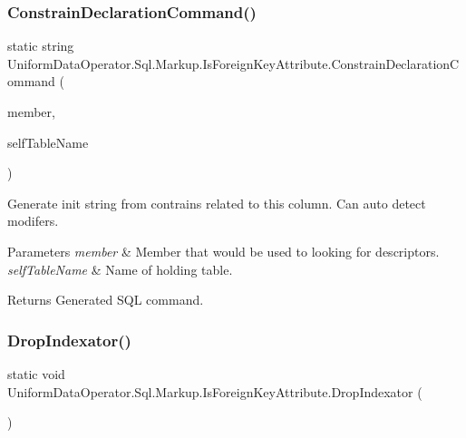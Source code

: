 \subsubsection{\texorpdfstring{Constrain\+Declaration\+Command()}{ConstrainDeclarationCommand()}\hspace{0.1cm}{\footnotesize\ttfamily [2/2]}}
{\footnotesize\ttfamily static string Uniform\+Data\+Operator.\+Sql.\+Markup.\+Is\+Foreign\+Key\+Attribute.\+Constrain\+Declaration\+Command (\begin{DoxyParamCaption}\item[{Member\+Info}]{member,  }\item[{string}]{self\+Table\+Name }\end{DoxyParamCaption})\hspace{0.3cm}{\ttfamily [static]}}



Generate init string from contrains related to this column. Can auto detect modifers. 


\begin{DoxyParams}{Parameters}
{\em member} & Member that would be used to looking for descriptors.\\
\hline
{\em self\+Table\+Name} & Name of holding table.\\
\hline
\end{DoxyParams}
\begin{DoxyReturn}{Returns}
Generated S\+QL command.
\end{DoxyReturn}
\mbox{\label{class_uniform_data_operator_1_1_sql_1_1_markup_1_1_is_foreign_key_attribute_abec2624118cb8518ddac018eb4bff213}} 
\subsubsection{\texorpdfstring{Drop\+Indexator()}{DropIndexator()}}
{\footnotesize\ttfamily static void Uniform\+Data\+Operator.\+Sql.\+Markup.\+Is\+Foreign\+Key\+Attribute.\+Drop\+Indexator (\begin{DoxyParamCaption}{ }\end{DoxyParamCaption})\hspace{0.3cm}{\ttfamily [static]}}



